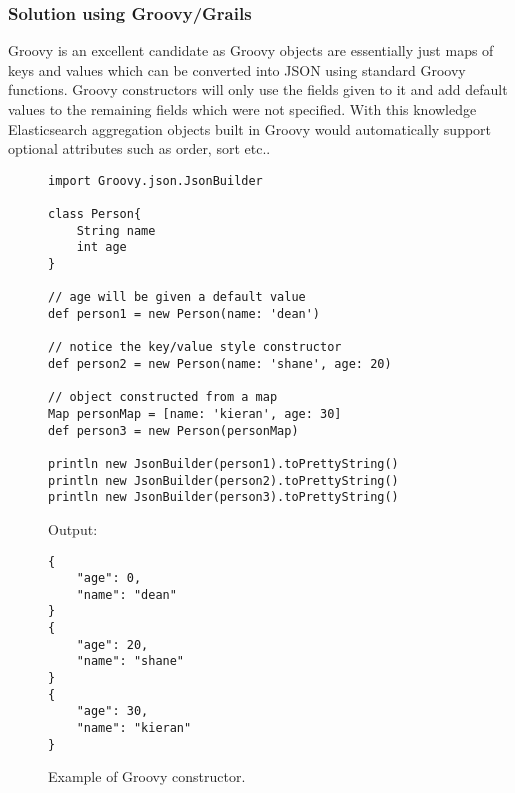 \documentclass[12pt,a4paper,titlepage]{report}
\begin{document}
\subsubsection{Solution using Groovy/Grails}
Groovy is an excellent candidate as Groovy objects are essentially just maps of keys and values which can be converted into JSON using standard Groovy functions. Groovy constructors will only use the fields given to it and add default values to the remaining fields which were not specified. With this knowledge Elasticsearch aggregation objects built in Groovy would automatically support optional attributes such as order, sort etc..
\begin{figure}[H]
\begin{tcolorbox}
\begin{verbatim}
import Groovy.json.JsonBuilder 

class Person{     
    String name 
    int age
}  

// age will be given a default value
def person1 = new Person(name: 'dean') 

// notice the key/value style constructor
def person2 = new Person(name: 'shane', age: 20) 

// object constructed from a map
Map personMap = [name: 'kieran', age: 30]
def person3 = new Person(personMap)

println new JsonBuilder(person1).toPrettyString()
println new JsonBuilder(person2).toPrettyString()
println new JsonBuilder(person3).toPrettyString()
\end{verbatim}

\medskip Output:
\begin{verbatim}
{
    "age": 0,
    "name": "dean"
}
{
    "age": 20,
    "name": "shane"
}
{
    "age": 30,
    "name": "kieran"
}
\end{verbatim}
\end{tcolorbox}
\caption{Example of Groovy constructor.}
\end{figure}
\end{document}

